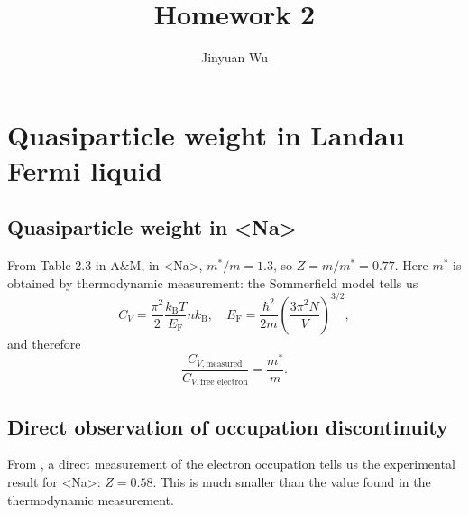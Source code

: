 \documentclass[hyperref, a4paper]{article}
\title{Homework 2}
\author{Jinyuan Wu}
\def\ce#1{<#1>}%
\newcommand*{\efermi}{E_{\text{F}}}
\newcommand*{\kB}{k_{\text{B}}}
\begin{document}
\maketitle

\section{Quasiparticle weight in Landau Fermi liquid}

\subsection{Quasiparticle weight in \ce{Na}}

From Table 2.3 in A\&M, in \ce{Na}, 
$m^* / m = 1.3$, 
so $Z = m / m^* = 0.77$.
Here $m^*$ is obtained by thermodynamic measurement:
the Sommerfield model tells us 
\begin{equation}
    C_V = \frac{\pi^2}{2} \frac{\kB T}{\efermi} n \kB, \quad 
    \efermi = \frac{\hbar^2}{2m} \left(\frac{3 \pi^2 N}{V}\right)^{3/2},
\end{equation}
and therefore 
\begin{equation}
    \frac{C_{V, \text{measured}}}{C_{V, \text{free electron}}} = \frac{m^*}{m}.
    \label{eq:c-m}
\end{equation}

\subsection{Direct observation of occupation discontinuity}

From \cite{huotari2010momentum}, 
a direct measurement of the electron occupation 
tells us the experimental result for \ce{Na}: $Z = 0.58$.
This is much smaller than the value found in the thermodynamic measurement.
\end{document}
